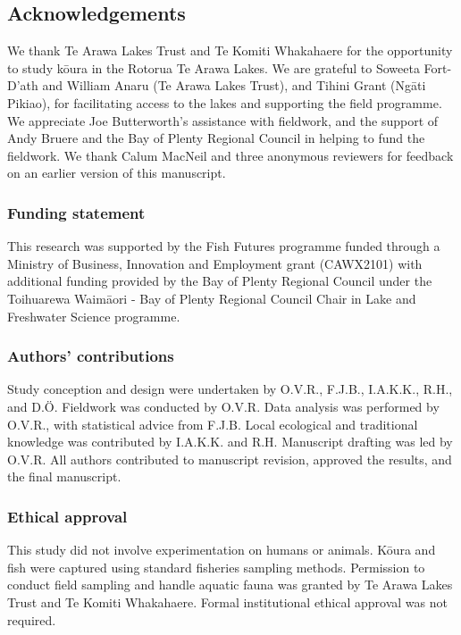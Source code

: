 \documentclass[
  letterpaper,
  DIV=11,
  numbers=noendperiod]{scrartcl}
\begin{document}
\subsection{Acknowledgements}\label{acknowledgements}

We thank Te Arawa Lakes Trust and Te Komiti Whakahaere for the
opportunity to study kōura in the Rotorua Te Arawa Lakes. We are
grateful to Soweeta Fort-D'ath and William Anaru (Te Arawa Lakes Trust),
and Tihini Grant (Ngāti Pikiao), for facilitating access to the lakes
and supporting the field programme. We appreciate Joe Butterworth's
assistance with fieldwork, and the support of Andy Bruere and the Bay of
Plenty Regional Council in helping to fund the fieldwork. We thank Calum
MacNeil and three anonymous reviewers for feedback on an earlier version
of this manuscript.

\subsubsection{Funding statement}\label{funding-statement}

This research was supported by the Fish Futures programme funded through
a Ministry of Business, Innovation and Employment grant (CAWX2101) with
additional funding provided by the Bay of Plenty Regional Council under
the Toihuarewa Waimāori - Bay of Plenty Regional Council Chair in Lake
and Freshwater Science programme.

\subsubsection{Authors' contributions}\label{authors-contributions}

Study conception and design were undertaken by O.V.R., F.J.B., I.A.K.K.,
R.H., and D.Ö. Fieldwork was conducted by O.V.R. Data analysis was
performed by O.V.R., with statistical advice from F.J.B. Local
ecological and traditional knowledge was contributed by I.A.K.K. and
R.H. Manuscript drafting was led by O.V.R. All authors contributed to
manuscript revision, approved the results, and the final manuscript.

\subsubsection{Ethical approval}\label{ethical-approval}

This study did not involve experimentation on humans or animals. Kōura
and fish were captured using standard fisheries sampling methods.
Permission to conduct field sampling and handle aquatic fauna was
granted by Te Arawa Lakes Trust and Te Komiti Whakahaere. Formal
institutional ethical approval was not required.
\end{document}
